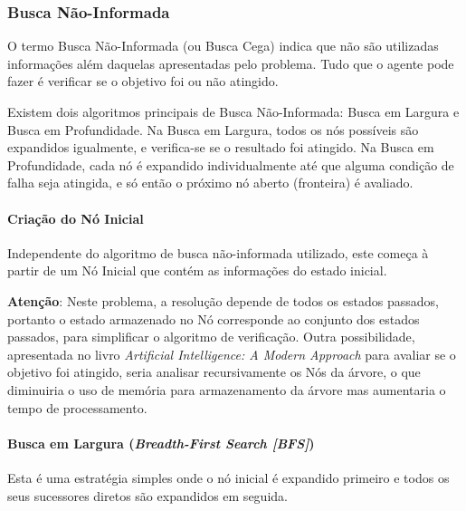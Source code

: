 \documentclass[11pt]{article}
\begin{document}
    \hypertarget{busca-nuxe3o-informada}{%
\subsubsection{Busca Não-Informada}\label{busca-nuxe3o-informada}}

O termo Busca Não-Informada (ou Busca Cega) indica que não são
utilizadas informações além daquelas apresentadas pelo problema. Tudo
que o agente pode fazer é verificar se o objetivo foi ou não atingido.

Existem dois algoritmos principais de Busca Não-Informada: Busca em
Largura e Busca em Profundidade. Na Busca em Largura, todos os nós
possíveis são expandidos igualmente, e verifica-se se o resultado foi
atingido. Na Busca em Profundidade, cada nó é expandido individualmente
até que alguma condição de falha seja atingida, e só então o próximo nó
aberto (fronteira) é avaliado.

\hypertarget{criauxe7uxe3o-do-nuxf3-inicial}{%
\paragraph{Criação do Nó Inicial}\label{criauxe7uxe3o-do-nuxf3-inicial}}

Independente do algoritmo de busca não-informada utilizado, este começa
à partir de um Nó Inicial que contém as informações do estado inicial.

\textbf{Atenção}: Neste problema, a resolução depende de todos os
estados passados, portanto o estado armazenado no Nó corresponde ao
conjunto dos estados passados, para simplificar o algoritmo de
verificação. Outra possibilidade, apresentada no livro \emph{Artificial
Intelligence: A Modern Approach} para avaliar se o objetivo foi
atingido, seria analisar recursivamente os Nós da árvore, o que
diminuiria o uso de memória para armazenamento da árvore mas aumentaria
o tempo de processamento.

    \hypertarget{busca-em-largura-breadth-first-search-bfs}{%
\paragraph{\texorpdfstring{Busca em Largura (\emph{Breadth-First Search
{[}BFS{]}})}{Busca em Largura (Breadth-First Search {[}BFS{]})}}\label{busca-em-largura-breadth-first-search-bfs}}

Esta é uma estratégia simples onde o nó inicial é expandido primeiro e
todos os seus sucessores diretos são expandidos em seguida.
\end{document}
